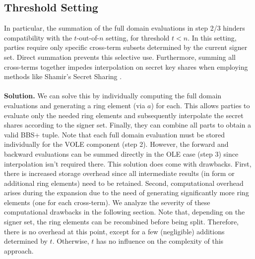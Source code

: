 \subsection{Threshold Setting}
\label{subsec:tauoutofnSetting}
In particular, the summation of the full domain evaluations in step 2/3 hinders compatibility with the $t$-out-of-$n$ setting, for threshold $t < n$. In this setting, parties require only specific cross-term subsets determined by the current signer set. Direct summation prevents this selective use. Furthermore, summing all cross-terms together impedes interpolation on secret key shares when employing methods like Shamir's Secret Sharing \cite{shamir1979share}.  
\\\\
\textbf{Solution.} We can solve this by individually computing the full domain evaluations and generating a ring element (via $a$) for each. This allows parties to evaluate only the needed ring elements and subsequently interpolate the secret shares according to the signer set. Finally, they can combine all parts to obtain a valid BBS+ tuple. Note that each full domain evaluation must be stored individually for the VOLE component (step 2). However, the forward and backward evaluations can be summed directly in the OLE case (step 3) since interpolation isn't required there. This solution does come with drawbacks. First, there is increased storage overhead since all intermediate results (in form or additional ring elements) need to be retained. Second, computational overhead arises during the expansion due to the need of generating significantly more ring elements (one for each cross-term). We analyze the severity of these computational drawbacks in the following section. Note that, depending on the signer set, the ring elements can be recombined before being split. Therefore, there is no overhead at this point, except for a few (negligible) additions determined by $t$. Otherwise, $t$ has no influence on the complexity of this approach.

